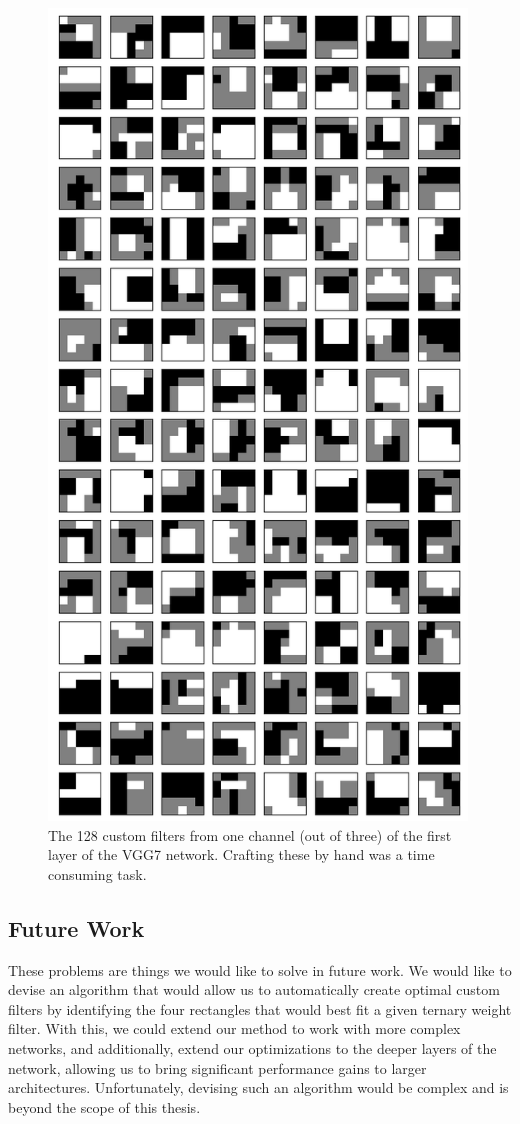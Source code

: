 \documentclass[11pt,a4paper,oldfontcommands]{memoir}
\begin{document}
\begin{figure}
    \centering
    \includegraphics[width=30em]{Methodology_Images/0-custom_filters.png}  %
    \caption{The 128 custom filters from one channel (out of three) of the first layer of the VGG7 network. Crafting these by hand was a time consuming task.}
    \label{fig:cifar_custom_filters_128}
\end{figure}


\subsection{Future Work}
These problems are things we would like to solve in future work. We would like to devise an algorithm that would allow us to automatically create optimal custom filters by identifying the four rectangles that would best fit a given ternary weight filter. With this, we could extend our method to work with more complex networks, and additionally, extend our optimizations to the deeper layers of the network, allowing us to bring significant performance gains to larger architectures. Unfortunately, devising such an algorithm would be complex and is beyond the scope of this thesis. 
\end{document}
